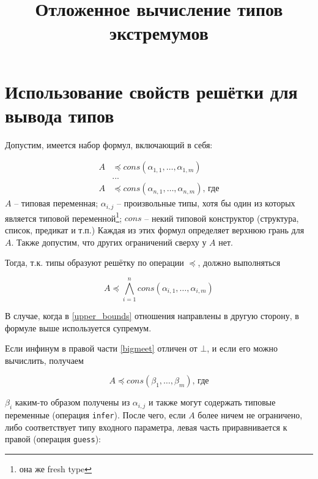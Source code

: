 \documentclass[10pt,russian]{article}
\newcommand{\subtype}{\preccurlyeq}
\newcommand{\bigmeet}{\bigwedge}
\begin{document}
\title{Отложенное вычисление типов экстремумов}
\maketitle

\section{Использование свойств решётки для вывода типов}

Допустим, имеется набор формул, включающий в себя:

\begin{equation}
\label{upper_bounds}
\begin{split}
A &\subtype cons(\alpha_{1,1}, \dotsc, \alpha_{1,m}) \\
  &... \\
A &\subtype cons(\alpha_{n,1}, \dotsc, \alpha_{n,m}) \text{, где}
\end{split}
\end{equation}
$A$ -- типовая переменная; $\alpha_{i,j}$ -- произвольные типы, хотя бы один из
которых является типовой переменной\footnote{она же fresh type}; $cons$ -- некий
типовой конструктор (структура, список, предикат и т.п.) Каждая из этих формул
определяет верхнюю грань для $A$. Также допустим, что других ограничений сверху
у $A$ нет.


Тогда, т.к. типы образуют решётку по операции $\subtype$, должно выполняться

\begin{equation}
\label{bigmeet}
A \subtype {\displaystyle\bigmeet_{i=1}^n cons(\alpha_{i,1}, \dotsc, \alpha_{i,m})}
\end{equation}

В случае, когда в \eqref{upper_bounds} отношения направлены в другую сторону,
в формуле выше используется супремум.

Если инфинум в правой части \eqref{bigmeet} отличен от $\bot$, и если его можно
вычислить, получаем

\begin{equation*}
A \subtype cons(\beta_1, \dotsc, \beta_m) \text{, где}
\end{equation*}

$\beta_i$ каким-то образом получены из $\alpha_{i,j}$ и также могут
содержать типовые переменные (операция \texttt{infer}). После чего, если $A$
более ничем не ограничено, либо соответствует типу входного параметра,
левая часть приравнивается к правой (операция \texttt{guess}):
\end{document}
